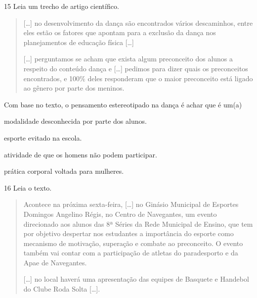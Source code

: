 \pagebreak
\num{15} Leia um trecho de artigo científico.
\begin{quote}
  {[}\ldots{}{]} no desenvolvimento da dança são encontrados vários
  descaminhos, entre eles estão os fatores que apontam para a exclusão
  da dança nos planejamentos de educação física {[}\ldots{}{]}

{[}\ldots{}{]} perguntamos se acham que exista algum preconceito dos alunos a
respeito do conteúdo dança e {[}\ldots{}{]} pedimos para dizer quais os
preconceitos encontrados, e 100\% deles responderam que o maior
preconceito está ligado ao gênero por parte dos meninos.

\end{quote}

\noindent{}Com base no texto, o pensamento estereotipado na dança é achar que é um(a)

\begin{escolha}
\item modalidade desconhecida por parte dos alunos.

\item esporte evitado na escola.

\item atividade de que os homens não podem participar.

\item prática corporal voltada para mulheres.
\end{escolha}


\num{16} Leia o texto.
\begin{quote}\enlargethispage{\baselineskip}
  Acontece na próxima sexta-feira, {[}\ldots{}{]} no Ginásio Municipal de
  Esportes Domingos Angelino Régis, no Centro de Navegantes, um evento
  direcionado aos alunos das 8ª Séries da Rede Municipal de Ensino, que
  tem por objetivo despertar nos estudantes a importância do esporte
  como mecanismo de motivação, superação e combate ao preconceito. O
  evento também vai contar com a participação de atletas do paradesporto
  e da Apae de Navegantes.

{[}\ldots{}{]} no local haverá uma apresentação das equipes de Basquete e
Handebol do Clube Roda Solta {[}\ldots{}{]}.
\end{quote}

